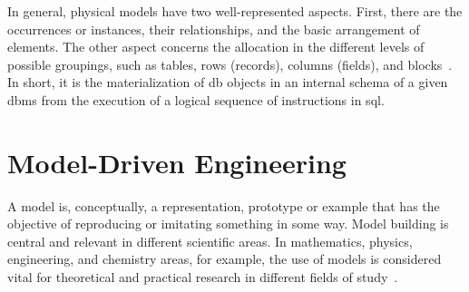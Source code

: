In general, physical models have two well-represented aspects.
First, there are the occurrences or instances, their relationships, and the basic arrangement of elements.
The other aspect concerns the allocation in the different levels of possible groupings, such as tables, rows (records), columns (fields), and blocks~\cite{West:2011}.
In short, it is the materialization of \ac{db} objects in an internal schema of a given \ac{dbms} from the execution of a logical sequence of instructions in \ac{sql}.

\section{Model-Driven Engineering}
\label{sec_back:mde}

A model is, conceptually, a representation, prototype or example that has the objective of reproducing or imitating something in some way.
Model building is central and relevant in different scientific areas.
In mathematics, physics, engineering, and chemistry areas, for example, the use of models is considered vital for theoretical and practical research in different fields of study~\cite{Bailer:2009}.

